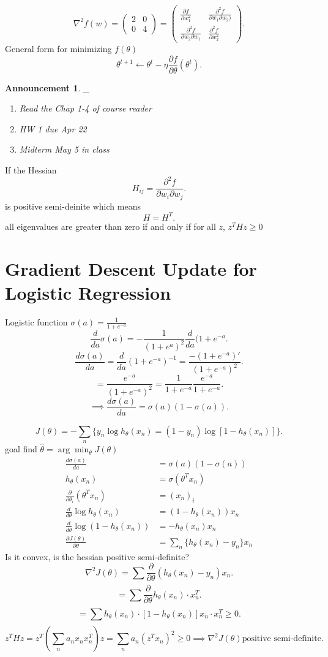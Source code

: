 \documentclass[a4paper,12pt]{scrartcl} %
\theoremstyle{darktheorem}
\newtheorem{announcement}[theorem]{Announcement}
\begin{document}
\[
    \nabla^2f(w) = \begin{pmatrix} 2 & 0 \\ 0 & 4 \end{pmatrix}  = \begin{pmatrix} \frac{\partial f}{\partial w_1^2} & \frac{\partial^2f}{\partial w_1 \partial w_2)} \\
    \frac{\partial^2f}{\partial w_2 \partial w_1} & \frac{\partial^2f}{\partial w_2^2}
\end{pmatrix} 
.\] 
General form for minimizing $f(\theta)$
\[
\theta^{t+1} \leftarrow \theta^{t} - \eta \frac{\partial f}{\partial \theta}(\theta^{t})
.\] 
\begin{announcement}
    \_\\
    \begin{enumerate}
        \item Read the Chap 1-4 of course reader
        \item HW 1 due Apr 22
        \item Midterm May 5 in class
    \end{enumerate}
\end{announcement}
If the Hessian
\[
    H_{ij} = \frac{\partial^2f}{\partial w_i \partial w_j}
.\] 
is positive semi-deinite
which means
\[
H = H^{T}
.\] 
all eigenvalues are greater than zero
if and only if
for all $z$, $z^{T}Hz \ge 0$
\section{Gradient Descent Update for Logistic Regression}
Logistic function $\sigma(a) = \frac{1}{1+e^{-a}}$ 
\[
\frac{d}{da}\sigma(a) = -\frac{1}{(1+e^{a})^2} \frac{d}{da} (1+e^{-a}
.\] 
\[
    \frac{d \sigma(a)}{da} = \frac{d}{da}(1+e^{-a})^{-1} = \frac{-(1+e^{-a})'}{(1+e^{-a})^2}
.\] 
\[
= \frac{e^{-a}}{(1+e^{-a})^2} = \frac{1}{1+e^{-a}} \frac{e^{-a}}{1+e^{-a}}
.\] 
\[
\implies \frac{d\sigma(a)}{da} = \sigma(a) (1- \sigma(a))
.\] 

\[
    J(\theta) = -\sum_{n}^{}\{y_n \log h_\theta(x_n) = ( 1- y_n)\log [1- h_\theta(x_n)]\}
.\] 
goal find $\hat \theta = \arg \min_\theta J(\theta)$
\begin{align*}
    \frac{d\sigma(a)}{da} &= \sigma(a) (1-\sigma(a))\\
    h_\theta(x_n) &= \sigma (\theta^{T}x_n)\\
    \frac{\partial}{\partial \theta_i}(\theta^{T}x_n) &= (x_n)_i\\
    \frac{d}{d\theta}\log h_\theta(x_n) &= (1-h_\theta(x_n))x_n\\
    \frac{d}{d \theta} \log(1-h_\theta(x_n)) &= -h_\theta(x_n)x_n \\
    \frac{\partial J(\theta)}{\partial \theta} &= \sum_{n}^{}\{h_\theta(x_n)-y_n\}x_n
\end{align*}
Is it convex, is the hessian positive semi-definite?
\[
\nabla^2J(\theta) =  \sum_{}^{} \frac{\partial}{\partial \theta} (h_\theta(x_n) -y_n)x_n
.\] 
\[
=\sum_{}^{} \frac{\partial}{\partial \theta}h_\theta(x_n) \cdot x_n^{T}
.\] 
\[
    = \sum_{}^{}h_\theta(x_n) \cdot [1-h_\theta(x_n)]x_n \cdot x_n^{T} \ge 0
.\] 
\[
    z^{T}Hz = z^{T}(\sum_{n}^{}a_nx_nx_n^{T})z = \sum_{n}^{}a_n(z^{T}x_n)^{2} \ge 0 \implies \nabla^2J(\theta) \text{positive semi-definite}
.\] 
\end{document}
